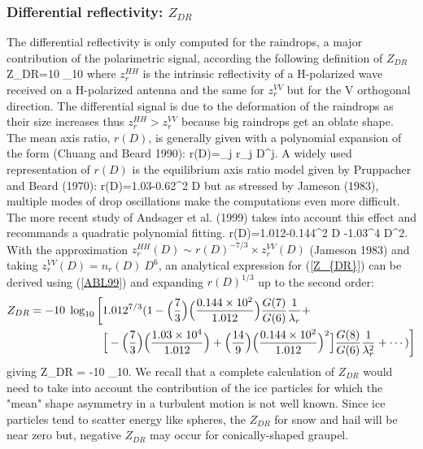 \subsubsection{Differential reflectivity: $Z_{DR}$}
%
The differential reflectivity is only computed for the raindrops, a major
contribution of the polarimetric signal, according the following definition of 
$Z_{DR}$
%
\beq\label{Z_{DR}}
Z_{DR}=10\; \log_{10}
\eeq
%
\noindent where $z^{HH}_r$ is the intrinsic reflectivity of a H-polarized wave 
received on a H-polarized antenna and the same for $z^{VV}_r$ but for 
the V orthogonal direction. The differential signal is due to the deformation 
of the raindrops as their size increases thus $z^{HH}_r>z^{VV}_r$ because big
raindrops get an oblate shape. The mean axis ratio, $r(D)$, is generally given 
with a polynomial expansion of the form (Chuang and Beard 1990):
%
\beq\label{axis}
r(D)=\sum_j r_j D^j.
\eeq
%
A widely used representation of $r(D)$ is the equilibrium axis ratio model
given by Pruppacher and Beard (1970):
%
\beq\label{PB70}
r(D)=1.03-0.62^{2} \times D
\eeq
%
\noindent but as stressed by Jameson (1983), multiple modes of drop oscillations
make the computations even more difficult. The more recent study of 
Andsager et al. (1999) takes into account this effect and recommands a 
quadratic polynomial fitting.
%
\beq\label{ABL99}
r(D)=1.012-0.144^{2} \times D -1.03^{4} \times D^2.
\eeq
%
With the approximation $z^{HH}_r(D) \sim r(D)^{-7/3} \times z^{VV}_r(D)$ 
(Jameson 1983) and taking $z^{VV}_r(D)=n_r(D)\ D^6$, an analytical expression 
for (\ref{Z_{DR}}) can be derived using (\ref{ABL99}) and expanding 
$r(D)^{1/3}$ up to the second order:
%
\begin{eqnarray}
Z_{DR} = -10\; \log_{10}\bigg[ &
1.012^{7/3}(1-\Big(\frac{7}{3}\Big)\Big(\frac{0.144 \times 10^{2}}{1.012}\Big)\frac{G(7)}{G(6)}\frac{1}{\lambda_r}+ \notag \\
& \Big[-\Big(\frac{7}{3}\Big)\Big(\frac{1.03 \times 10^{4}}{1.012}\Big)+\Big(\frac{14}{9}\Big)\Big(\frac{0.144 \times 10^{2}}{1.012}\Big)^2\Big]\frac{G(8)}{G(6)}\frac{1}{\lambda_r^2}+\dotsb)\bigg]
\end{eqnarray}
%
giving
%
\beq\label{approxZABL_{DR}}
Z_{DR} = -10\; \log_{10}.
\eeq
%
We recall that a complete calculation of 
$Z_{DR}$ would need to take into account the contribution of the ice particles
for which the "mean" shape asymmetry in a turbulent motion is not well known.
Since ice particles tend to scatter energy like spheres, the $Z_{DR}$ for snow
and hail will be near zero but, negative $Z_{DR}$ may occur for 
conically-shaped graupel.

